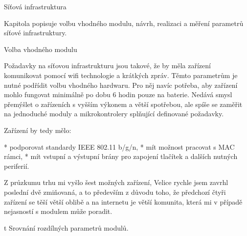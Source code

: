 
\def\ctustyle{{\ssr CTUstyle}}
\def\ttb{\tt\char`\\} %

\chap Síťová infrastruktura

Kapitola popisuje volbu vhodného modulu, návrh, realizaci a měření parametrů síťové infrastruktury.

\sec Volba vhodného modulu

Požadavky na síťovou infrastrukturu jsou takové, že by měla zařízení komunikovat pomocí wifi technologie a krátkých zpráv. Těmto parametrům je nutné podřídit volbu vhodného hardwaru. Pro něj navíc potřeba, aby zařízení mohlo fungovat minimálně po dobu 6 hodin pouze na baterie. Nedává smysl přemýšlet o zařízeních s vyšším výkonem a větší spotřebou, ale spíše se zaměřit na jednoduché moduly a mikrokontrolery splňující definované požadavky.

Zařízení by tedy mělo:

\begitems
* podporovat standardy IEEE 802.11 b/g/n,
* mít možnost pracovat s MAC rámci,
* mít vstupní a výstupní brány pro zapojení tlačítek a dalších nutných periferií.

\enditems

Z průzkumu trhu mi vyšlo šest možných zařízení, Velice rychle jsem zavrhl poslední dvě zmiňovaná, a to především z důvodu toho, že předchozí čtyři zařízení se těší větší oblibě a na internetu je větší komunita, která mi v případě nejasností s modulem může poradit.

\midinsert {}
\caption/t Srovnání rozdílných parametrů modulů.
\endinsert

